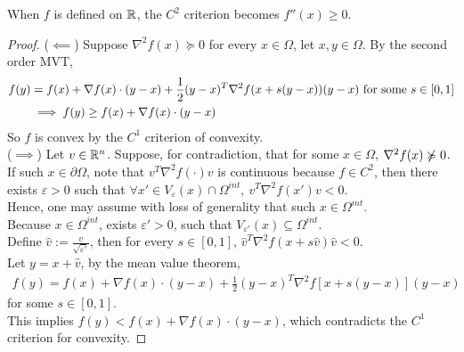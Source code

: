 \documentclass{article}
\begin{document}
    \begin{corollary}
    	When $f$ is defined on $\mathbb{R}$, the $C^2$ criterion becomes $f''(x) \geq 0$.
    \end{corollary}
    
    \begin{proof}
        ($\impliedby$) Suppose $\nabla^2 f(x) \succcurlyeq 0$ for every $x \in \Omega$, let $x, y \in \Omega$. By the second order MVT,
        \begin{align}
        	f(y) &= f(x) + \nabla f(x) \cdot (y - x) + \frac{1}{2} (y-x)^T \nabla^2 f(x + s (y - x)) (y - x)\text{{ for some }} s \in [0, 1] \\
        	&\implies f(y) \geq f(x) + \nabla f(x) \cdot (y - x)
        \end{align}
        So $f$ is convex by the $C^1$ criterion of convexity.\\
        ($\implies$) Let $v \in \mathbb{R}^n$. Suppose, for contradiction, that for some $x \in \Omega$, $\nabla^2 f(x) \centernot \succcurlyeq 0$.\\
        If such $x \in \partial \Omega$, note that $v^T \nabla^2 f(\cdot) v$ is continuous because $f \in C^2$, then there exists $\varepsilon > 0$ such that $\forall x' \in V_\varepsilon(x) \cap \Omega^{int},\ v^T \nabla^2 f(x') v < 0$.\\
        Hence, one may assume with loss of generality that such $x \in \Omega^{int}$.\\
        Because $x \in \Omega^{int}$, exists $\varepsilon' > 0$, such that $V_{\varepsilon'}(x) \subseteq \Omega^{int}$.\\
        Define $\hat{v} := \frac{v}{\sqrt{\varepsilon'}}$, then for every $s \in [0, 1]$, $\hat{v}^T \nabla^2 f(x + s\hat{v}) \hat{v} < 0$.\\
        Let $y = x + \hat{v}$, by the mean value theorem, 
        \begin{align}
        	f(y) = f(x) + \nabla f(x) \cdot (y - x) + \frac{1}{2} (y - x)^T \nabla^2 f [x + s (y - x)] (y - x)
        \end{align}
	 	for some $s \in [0, 1]$.\\
        This implies $f(y) < f(x) + \nabla f(x) \cdot (y - x)$, which contradicts the $C^1$ criterion for convexity.
    \end{proof}
    
\end{document}
